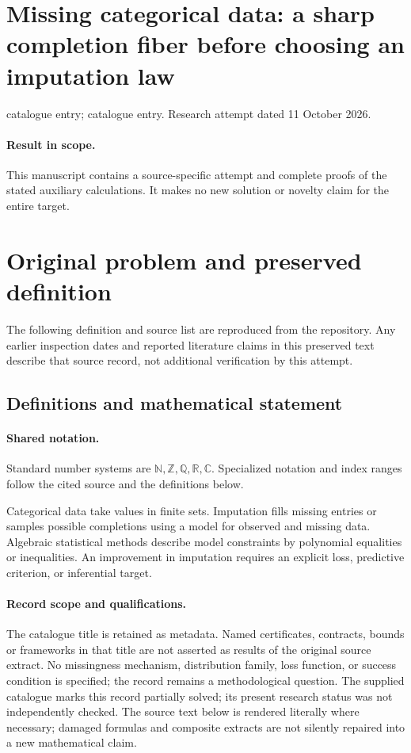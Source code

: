 \documentclass[11pt]{article}
\begin{document}
\section*{Missing categorical data: a sharp completion fiber before choosing an imputation law}
\noindent catalogue entry; catalogue entry. Research attempt dated 11 October 2026.
\paragraph{Result in scope.}This manuscript contains a source-specific attempt and complete proofs of the stated auxiliary calculations. It makes no new solution or novelty claim for the entire target.
\section{Original problem and preserved definition}
The following definition and source list are reproduced from the repository. Any earlier inspection dates and reported literature claims in this preserved text describe that source record, not additional verification by this attempt.
\subsection{Definitions and mathematical statement}

\paragraph{Shared notation.}Standard number systems are $\mathbb N,\mathbb Z,\mathbb Q,\mathbb R,\mathbb C$. Specialized notation and index ranges follow the cited source and the definitions below.


Categorical data take values in finite sets. Imputation fills missing entries or samples possible completions using a model for observed and missing data. Algebraic statistical methods describe model constraints by polynomial equalities or inequalities. An improvement in imputation requires an explicit loss, predictive criterion, or inferential target.
\paragraph{Record scope and qualifications.}
The catalogue title is retained as metadata. Named certificates, contracts, bounds or frameworks in that title are not asserted as results of the original source extract.
No missingness mechanism, distribution family, loss function, or success condition is specified; the record remains a methodological question. The supplied catalogue marks this record partially solved; its present research status was not independently checked.
The source text below is rendered literally where necessary; damaged formulas and composite extracts are not silently repaired into a new mathematical claim.
\end{document}
